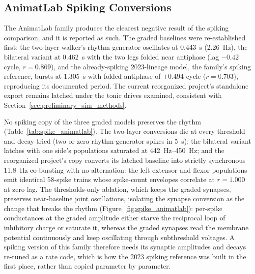 \subsection{AnimatLab Spiking Conversions}

The AnimatLab family produces the clearest negative result of the spiking comparison, and it is reported as such. The graded baselines were re-established first: the two-layer walker's rhythm generator oscillates at \qty{0.443}{\second} (\qty{2.26}{\hertz}), the bilateral variant at \qty{0.462}{\second} with the two legs folded near antiphase (lag $-0.42$ cycle, $r = 0.869$), and the already-spiking 2023-lineage model, the family's spiking reference, bursts at \qty{1.305}{\second} with folded antiphase of $+0.494$ cycle ($r = 0.703$), reproducing its documented period. The current reorganized project's standalone export remains latched under the tonic drives examined, consistent with Section~\ref{sec:preliminary_sim_methods}.

No spiking copy of the three graded models preserves the rhythm (Table~\ref{tab:spike_animatlab}). The two-layer conversions die at every threshold and decay tried (two or zero rhythm-generator spikes in \qty{5}{\second}); the bilateral variant latches with one side's populations saturated at \qty{442}{\hertz}--\qty{450}{\hertz}; and the reorganized project's copy converts its latched baseline into strictly synchronous \qty{11.8}{\hertz} co-bursting with no alternation: the left extensor and flexor populations emit identical 58-spike trains whose spike-count envelopes correlate at $r = 1.000$ at zero lag. The thresholds-only ablation, which keeps the graded synapses, preserves near-baseline joint oscillations, isolating the synapse conversion as the change that breaks the rhythm (Figure~\ref{fig:spike_animatlab}): per-spike conductances at the graded amplitude either starve the reciprocal loop of inhibitory charge or saturate it, whereas the graded synapses read the membrane potential continuously and keep oscillating through subthreshold voltages. A spiking version of this family therefore needs its synaptic amplitudes and decays re-tuned as a rate code, which is how the 2023 spiking reference was built in the first place, rather than copied parameter by parameter.

